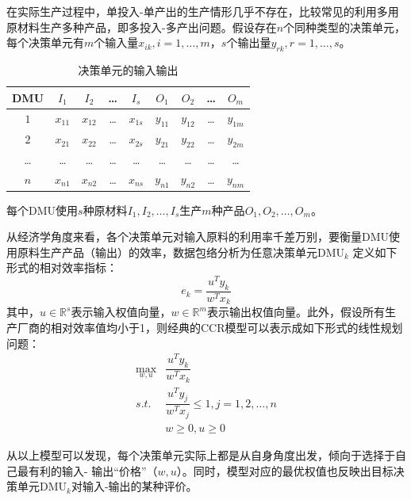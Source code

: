 在实际生产过程中，单投入-单产出的生产情形几乎不存在，比较常见的利用多用原材料生产多种产品，即多投入-多产出问题。假设存在$n$个同种类型的决策单元，每个决策单元有$m$个输入量$x_{ik},i=1,\ldots,m$，$s$个输出量$y_{rk},r=1,\ldots,s$。

\begin{table}[htbp]\label{tbl:dmu}\caption{决策单元的输入输出}\vskip 2mm
\centering
\begin{tabular}{|c|c|c|c|c||c|c|c|c|}
  \hline
  DMU & $I_1$ & $I_2$ & \ldots & $I_s$ & $O_1$ & $O_2$ & \ldots & $O_m$\\
  \hline
  $1$ & $x_{11}$ & $x_{12}$ & \ldots & $x_{1s}$ &$y_{11}$ & $y_{12}$ & \ldots & $y_{1m}$\\
  $2$ & $x_{21}$ & $x_{22}$ & \ldots & $x_{2s}$ & $y_{21}$ & $y_{22}$ & \ldots & $y_{2m}$\\
  \ldots & \ldots & \ldots & \ldots & \ldots & \ldots & \ldots & \ldots & \ldots\\
  $n$ & $x_{n1}$ & $x_{n2}$ & \ldots & $x_{ns}$ & $y_{n1}$ & $y_{n2}$ & \ldots & $y_{nm}$\\
  \hline
\end{tabular}
\end{table}
每个DMU使用$s$种原材料$I_1,I_2,\ldots, I_s$生产$m$种产品$O_1,O_2,\ldots,O_m$。

从经济学角度来看，各个决策单元对输入原料的利用率千差万别，要衡量DMU使用原料生产产品（输出）的效率，数据包络分析为任意决策单元$\mathrm{DMU}_k$ 定义如下形式的相对效率指标：
\begin{equation}\label{eq:relativeefficient}
  e_k = \frac{u^T y_k}{w^T x_k}
\end{equation}
其中，$u\in \mathbb{R}^s$表示输入权值向量，$w\in \mathbb{R}^m$表示输出权值向量。此外，假设所有生产厂商的相对效率值均小于1，则经典的CCR模型可以表示成如下形式的线性规划问题：
\begin{equation}\label{eq:fracccr}
\begin{array}{ll}
  \max\limits_{w, u} & \dfrac{u^Ty_k}{w^Tx_k}\\
  \textit{s.t.} &\dfrac{u^Ty_j}{w^Tx_j}\leq 1, j=1,2,\dots,n\\
   & w\geq 0, u\geq 0
\end{array}
\end{equation}

从以上模型可以发现，每个决策单元实际上都是从自身角度出发，倾向于选择于自己最有利的输入- 输出“价格”（$w,u$）\cite{kao2005dea}。同时，模型对应的最优权值也反映出目标决策单元$\mathrm{DMU}_k$对输入-输出的某种评价。

